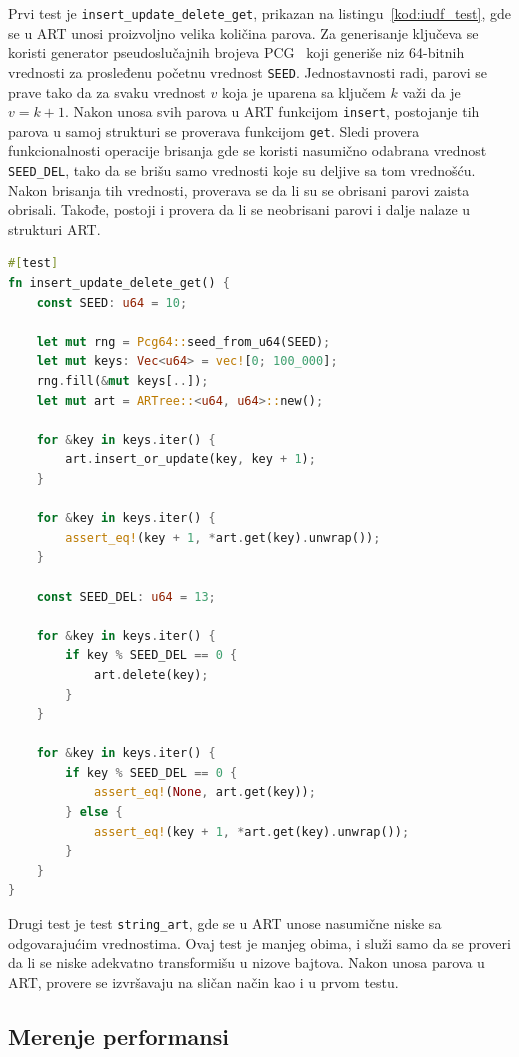 \documentclass[12pt,oneside]{memoir}
\begin{document}
Prvi test je \texttt{insert\_update\_delete\_get}, prikazan na
listingu~\ref{kod:iudf_test}, gde se
u ART unosi proizvoljno velika količina parova.
Za generisanje ključeva se koristi generator
pseudoslučajnih brojeva PCG~\cite{pcg} koji generiše niz
64-bitnih vrednosti za prosleđenu početnu vrednost \texttt{SEED}.
Jednostavnosti radi, parovi se prave tako da
za svaku vrednost $v$ koja je uparena sa ključem $k$
važi da je $v = k + 1$. Nakon unosa svih parova u ART funkcijom
\texttt{insert}, postojanje tih parova u samoj strukturi
se proverava funkcijom \texttt{get}. Sledi provera funkcionalnosti
operacije brisanja gde se koristi nasumično odabrana vrednost
\texttt{SEED\_DEL}, tako da se brišu samo vrednosti koje su deljive
sa tom vrednošću. Nakon brisanja tih vrednosti, proverava se
da li su se obrisani parovi zaista obrisali. Takođe, postoji i
provera da li se neobrisani parovi i dalje nalaze u strukturi ART.\

\begin{lstlisting}[language=Rust,
                   caption={Test \texttt{insert\_update\_delete\_get}},
                   label={kod:iudf_test}]
#[test]
fn insert_update_delete_get() {
    const SEED: u64 = 10;

    let mut rng = Pcg64::seed_from_u64(SEED);
    let mut keys: Vec<u64> = vec![0; 100_000];
    rng.fill(&mut keys[..]);
    let mut art = ARTree::<u64, u64>::new();

    for &key in keys.iter() {
        art.insert_or_update(key, key + 1);
    }

    for &key in keys.iter() {
        assert_eq!(key + 1, *art.get(key).unwrap());
    }

    const SEED_DEL: u64 = 13;

    for &key in keys.iter() {
        if key % SEED_DEL == 0 {
            art.delete(key);
        }
    }

    for &key in keys.iter() {
        if key % SEED_DEL == 0 {
            assert_eq!(None, art.get(key));
        } else {
            assert_eq!(key + 1, *art.get(key).unwrap());
        }
    }
}
\end{lstlisting}

Drugi test je test \texttt{string\_art},
gde se u ART unose nasumične niske sa odgovarajućim vrednostima.
Ovaj test je manjeg obima, i služi samo da se proveri da li se niske
adekvatno transformišu u nizove bajtova. Nakon unosa parova u ART,
provere se izvršavaju na sličan način kao i u prvom testu.

\subsection{Merenje performansi}
\end{document}
